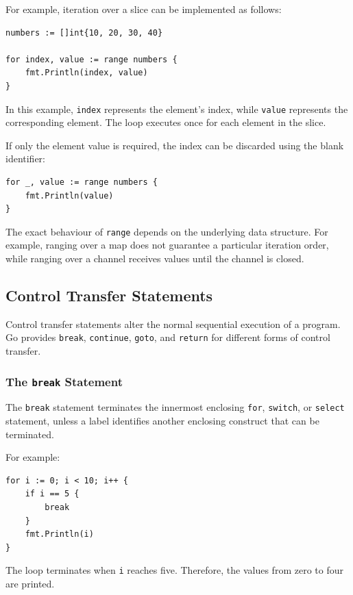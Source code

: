 For example, iteration over a slice can be implemented as
follows:

\begin{lstlisting}
numbers := []int{10, 20, 30, 40}

for index, value := range numbers {
    fmt.Println(index, value)
}
\end{lstlisting}

In this example, \texttt{index} represents the element's
index, while \texttt{value} represents the corresponding
element. The loop executes once for each element in the
slice.

If only the element value is required, the index can be
discarded using the blank identifier:

\begin{lstlisting}
for _, value := range numbers {
    fmt.Println(value)
}
\end{lstlisting}

The exact behaviour of \texttt{range} depends on the
underlying data structure. For example, ranging over a map
does not guarantee a particular iteration order, while
ranging over a channel receives values until the channel
is closed.

\subsection{Control Transfer Statements}

Control transfer statements alter the normal sequential
execution of a program. Go provides \texttt{break},
\texttt{continue}, \texttt{goto}, and \texttt{return} for
different forms of control transfer.

\subsubsection{The \texttt{break} Statement}

The \texttt{break} statement terminates the innermost
enclosing \texttt{for}, \texttt{switch}, or \texttt{select}
statement, unless a label identifies another enclosing
construct that can be terminated.

For example:

\begin{lstlisting}
for i := 0; i < 10; i++ {
    if i == 5 {
        break
    }
    fmt.Println(i)
}
\end{lstlisting}

The loop terminates when \texttt{i} reaches five. Therefore,
the values from zero to four are printed.

